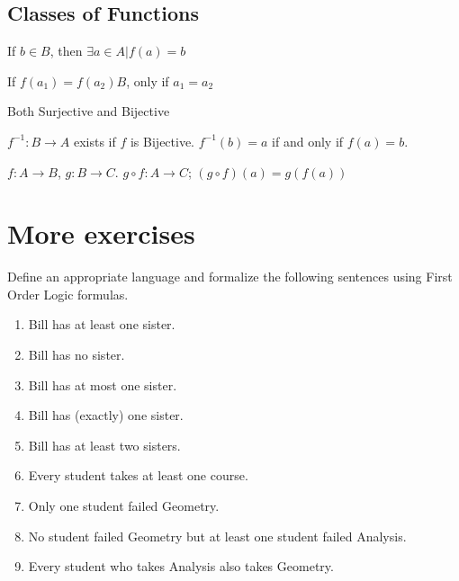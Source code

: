 \subsection{Classes of Functions}
\begin{definition}[Surjective]
  {\color{sol} If $b \in B$, then $\exists a \in A|f(a) = b$}
\end{definition}

\begin{definition}[Injective]
  {\color{sol} If $f(a_1) = f(a_2)B$, only if $a_1 = a_2$}
\end{definition}

\begin{definition}[Bijective]
  Both Surjective and Bijective
\end{definition}

\begin{definition}[Inverse]
  {\color{sol} $f^{-1} : B \to A$ exists if $f$ is Bijective. $f^{-1}(b) = a$ if and only if $f(a) = b$.}
\end{definition}

\begin{definition}[Composition]
  $f: A \to B$, $g : B \to C$. $g \circ f : A \to C$; $(g \circ f)(a) = g(f(a))$
\end{definition}

\newpage
\section{More exercises}

\begin{example}
Define an appropriate language and formalize the following sentences using
First Order Logic formulas.\\
\begin{enumerate}
\item Bill has at least one sister.
\item Bill has no sister.
\item Bill has at most one sister.
\item Bill has (exactly) one sister.
\item Bill has at least two sisters.
\item Every student takes at least one course.
\item Only one student failed Geometry.
\item No student failed Geometry but at least one student failed Analysis.
\item Every student who takes Analysis also takes Geometry.
\end{enumerate}
\end{example}

